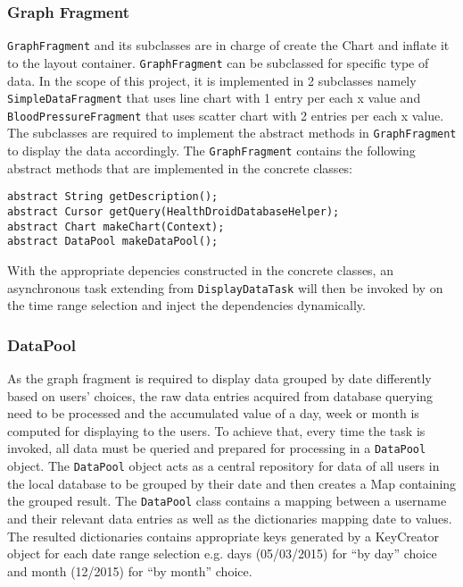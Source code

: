 \subsubsection{Graph Fragment}
\texttt{GraphFragment} and its subclasses are in charge of create the Chart and inflate it to the layout container.
\texttt{GraphFragment} can be subclassed for specific type of data. In the scope of this project, it is implemented in 2
subclasses namely \texttt{SimpleDataFragment} that uses line chart with 1 entry per each x value and
\texttt{BloodPressureFragment} that uses scatter chart with 2 entries per each x value. The subclasses are required to
implement the abstract methods in \texttt{GraphFragment} to display the data accordingly.
The \texttt{GraphFragment} contains the following abstract methods that are implemented in the concrete classes:
\begin{lstlisting}
abstract String getDescription();
abstract Cursor getQuery(HealthDroidDatabaseHelper);
abstract Chart makeChart(Context);
abstract DataPool makeDataPool();
\end{lstlisting}
With the appropriate depencies constructed in the concrete classes, an asynchronous task extending from
\texttt{DisplayDataTask} will then be invoked by on the time range selection and inject the dependencies dynamically.

\subsubsection{DataPool}
As the graph fragment is required to display data grouped by date differently based on users' choices, the raw data
entries acquired from database querying need to be processed and the accumulated value of a day, week or month is
computed for displaying to the users. To achieve that, every time the task is invoked, all data must be queried and
prepared for processing in a \texttt{DataPool} object. The \texttt{DataPool} object acts as a central repository for
data of all users in the local database to be grouped by their date and then creates a Map containing the grouped
result. The \texttt{DataPool} class contains a mapping between a username and their relevant data entries as well as the
dictionaries mapping date to values. The resulted dictionaries contains appropriate keys generated by a KeyCreator
object for each date range selection e.g. days (05/03/2015) for ``by day'' choice and month (12/2015) for ``by month''
choice.

